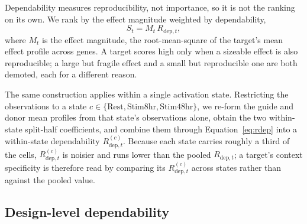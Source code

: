 \documentclass[11pt]{article}
\newcommand{\Rdep}{R_{\mathrm{dep},t}}
\begin{document}
Dependability measures reproducibility, not importance, so it is not the ranking on
its own. We rank by the effect magnitude weighted by dependability,
\begin{equation}
S_t = M_t \, \Rdep,
\label{eq:score}
\end{equation}
where $M_t$ is the effect magnitude, the root-mean-square of the target's mean effect
profile across genes. A target scores high only when a sizeable effect is also
reproducible; a large but fragile effect and a small but reproducible one are both
demoted, each for a different reason.

The same construction applies within a single activation state. Restricting the
observations to a state $c \in \{\mathrm{Rest}, \mathrm{Stim8hr}, \mathrm{Stim48hr}\}$,
we re-form the guide and donor mean profiles from that state's observations alone,
obtain the two within-state split-half coefficients, and combine them through
Equation~\eqref{eq:rdep} into a within-state dependability $\Rdep^{(c)}$.
Because each state carries roughly a third of the cells, $\Rdep^{(c)}$ is noisier and
runs lower than the pooled $\Rdep$; a target's context specificity is therefore read
by comparing its $\Rdep^{(c)}$ across states rather than against the pooled value.

\subsection{Design-level dependability}
\end{document}
